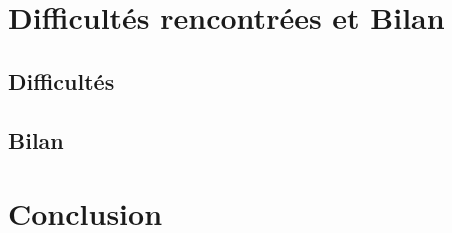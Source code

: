 

\section{Difficultés rencontrées et Bilan}

\subsection{Difficultés}

\subsection{Bilan}

\section*{Conclusion}
